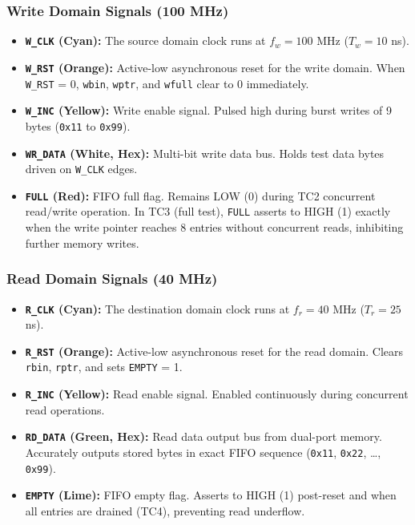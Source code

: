 \documentclass[12pt,a4paper]{article}
\begin{document}
\subsubsection{Write Domain Signals (100 MHz)}
\begin{itemize}
    \item \textbf{\texttt{W\_CLK} (Cyan):} The source domain clock runs at $f_w = 100$ MHz ($T_w = 10$ ns).
    \item \textbf{\texttt{W\_RST} (Orange):} Active-low asynchronous reset for the write domain. When \texttt{W\_RST} = 0, \texttt{wbin}, \texttt{wptr}, and \texttt{wfull} clear to 0 immediately.
    \item \textbf{\texttt{W\_INC} (Yellow):} Write enable signal. Pulsed high during burst writes of 9 bytes (\texttt{0x11} to \texttt{0x99}).
    \item \textbf{\texttt{WR\_DATA} (White, Hex):} Multi-bit write data bus. Holds test data bytes driven on \texttt{W\_CLK} edges.
    \item \textbf{\texttt{FULL} (Red):} FIFO full flag. Remains LOW (0) during TC2 concurrent read/write operation. In TC3 (full test), \texttt{FULL} asserts to HIGH (1) exactly when the write pointer reaches 8 entries without concurrent reads, inhibiting further memory writes.
\end{itemize}

\subsubsection{Read Domain Signals (40 MHz)}
\begin{itemize}
    \item \textbf{\texttt{R\_CLK} (Cyan):} The destination domain clock runs at $f_r = 40$ MHz ($T_r = 25$ ns).
    \item \textbf{\texttt{R\_RST} (Orange):} Active-low asynchronous reset for the read domain. Clears \texttt{rbin}, \texttt{rptr}, and sets \texttt{EMPTY} = 1.
    \item \textbf{\texttt{R\_INC} (Yellow):} Read enable signal. Enabled continuously during concurrent read operations.
    \item \textbf{\texttt{RD\_DATA} (Green, Hex):} Read data output bus from dual-port memory. Accurately outputs stored bytes in exact FIFO sequence (\texttt{0x11}, \texttt{0x22}, \dots, \texttt{0x99}).
    \item \textbf{\texttt{EMPTY} (Lime):} FIFO empty flag. Asserts to HIGH (1) post-reset and when all entries are drained (TC4), preventing read underflow.
\end{itemize}
\end{document}
